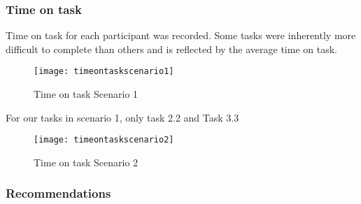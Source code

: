 \subsubsection{Time on task}
Time on task for each participant was recorded. Some tasks were inherently more difficult to complete than others and is reflected by the average time on task.
\begin{figure}[h!]
    \centering
        \texttt{[image: timeontaskscenario1]}
    \caption{Time on task Scenario 1}
    \label{timeontaskscenario1}
\end{figure}
For our tasks in scenario 1, only task 2.2 and Task 3.3
\begin{figure}[h!]
    \centering
        \texttt{[image: timeontaskscenario2]}
    \caption{Time on task Scenario 2}
    \label{timeontaskscenario2}
\end{figure}

\subsubsection{Recommendations}
